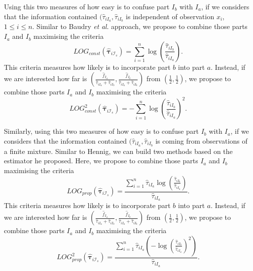 \documentclass[10pt, a4paper]{article}
\newcommand{\m}[1]{\boldsymbol{#1}}
\begin{document}
Using this two measures of how easy is to confuse part $I_b$ with $I_a$, if we considers that the information contained $(\hat{\tau}_{iI_a}, \hat{\tau}_{iI_b}$ is independent of observation $x_i$, $1 \leq i \leq n$. Similar to Baudry \emph{et al.} approach, we propose to combine those parts $I_a$ and $I_b$ maximising the criteria
\[
LOG_{const}( \hat{\m \tau}_{i \mathcal{I}_s} ) = \sum_{i=1}^n \log (\frac{ \hat{\tau}_{iI_b} }{ \hat{\tau}_{iI_a} }).
\]
This criteria measures how likely is to incorporate part $b$ into part $a$. Instead, if we are interested how far is $(\frac{\hat{f}_{I_a}}{\hat{\tau}_{iI_a} + \hat{\tau}_{iI_b}}, \frac{\hat{f}_{I_b}}{\hat{\tau}_{iI_a} + \hat{\tau}_{iI_b}})$ from $(\frac{1}{2}, \frac{1}{2})$, we propose to combine those parts $I_a$ and $I_b$ maximising the criteria
\[
LOG^2_{const}( \hat{\m \tau}_{i \mathcal{I}_s} ) = -\sum_{i=1}^n \log (\frac{ \hat{\tau}_{iI_b} }{ \hat{\tau}_{iI_a} })^2.
\]

Similarly, using this two measures of how easy is to confuse part $I_b$ with $I_a$, if we considers that the information contained $(\hat{\tau}_{iI_a}, \hat{\tau}_{iI_b}$ is coming from observations of a finite mixture. Similar to Hennig, we can build two methods based on the estimator he proposed. Here, we propose to combine those parts $I_a$ and $I_b$ maximising the criteria
\[
LOG_{prop}( \hat{\m \tau}_{i \mathcal{I}_s} ) = \frac{ \sum_{i=1}^n \hat{\tau}_{iI_a} \log (\frac{ \hat{\tau}_{iI_b} }{ \hat{\tau}_{iI_a} })}{\hat{\tau}_{iI_a}}.
\]
This criteria measures how likely is to incorporate part $b$ into part $a$. Instead, if we are interested how far is $(\frac{\hat{f}_{I_a}}{\hat{\tau}_{iI_a} + \hat{\tau}_{iI_b}}, \frac{\hat{f}_{I_b}}{\hat{\tau}_{iI_a} + \hat{\tau}_{iI_b}})$ from $(\frac{1}{2}, \frac{1}{2})$, we propose to combine those parts $I_a$ and $I_b$ maximising the criteria
\[
LOG^2_{prop}( \hat{\m \tau}_{i \mathcal{I}_s} ) = \frac{ \sum_{i=1}^n \hat{\tau}_{iI_a} (-\log (\frac{ \hat{\tau}_{iI_b} }{ \hat{\tau}_{iI_a} })^2)}{\hat{\tau}_{iI_a}}.
\]
\end{document}
